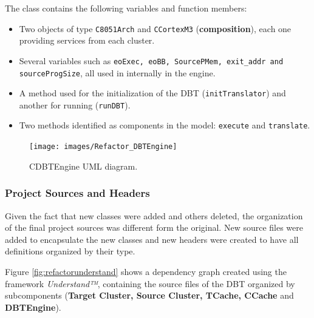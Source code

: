 The class contains the following variables and function members:
\begin{itemize}
\item Two objects of type \texttt{C8051Arch} and \texttt{CCortexM3} (\textbf{composition}), each one providing services from each cluster.
\item Several variables such as \texttt{eoExec, eoBB, SourcePMem, exit\_addr and sourceProgSize}, all used in internally in the engine.
\item A method used for the initialization of the DBT (\texttt{initTranslator}) and another for running (\texttt{runDBT}).
\item Two methods identified as components in the model: \texttt{execute} and \texttt{translate}.
\end{itemize}


\begin{figure}[H]
\centerline{
\texttt{[image: images/Refactor\_DBTEngine]}
}
\caption{CDBTEngine UML diagram.}
\label{fig:refactorproject} 
\end{figure}


\subsubsection*{Project Sources and Headers}

Given the fact that new classes were added and others deleted, the organization of the final project sources was different form the original. New source files were added to encapsulate the new classes and new headers were created to have all definitions organized by their type.

Figure \ref{fig:refactorunderstand} shows a dependency graph created using the framework \textit{Understand™}, containing the source files of the DBT organized by subcomponents (\textbf{Target Cluster, Source Cluster, TCache, CCache} and \textbf{DBTEngine}).
 
